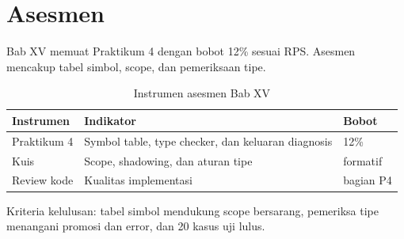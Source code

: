 \section*{Asesmen}

Bab XV memuat Praktikum 4 dengan bobot 12\% sesuai RPS. Asesmen
mencakup tabel simbol, scope, dan pemeriksaan tipe.

\begin{table}[H]
\centering
\caption{Instrumen asesmen Bab XV}
\label{tab:ch15-asesmen}
\begin{tabularx}{\textwidth}{@{}lXl@{}}
\toprule
\textbf{Instrumen} & \textbf{Indikator} & \textbf{Bobot} \\
\midrule
Praktikum 4 & Symbol table, type checker, dan keluaran diagnosis &
12\% \\
Kuis & Scope, shadowing, dan aturan tipe & formatif \\
Review kode & Kualitas implementasi & bagian P4 \\
\bottomrule
\end{tabularx}
\end{table}

Kriteria kelulusan: tabel simbol mendukung scope bersarang,
pemeriksa tipe menangani promosi dan error, dan 20 kasus uji lulus.
